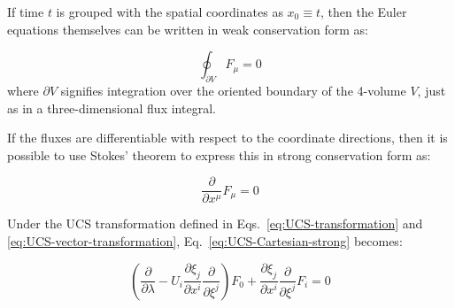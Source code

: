 
If time $t$ is grouped with the spatial coordinates as $x_0 \equiv t$, then the Euler equations themselves can be written in weak conservation form as:

\begin{equation}
\label{eq:UCS-Cartesian-weak}
\oint_{\partial V} {{F_\mu } = 0} 
\end{equation}
where $\partial V$ signifies integration over the oriented boundary of the 4-volume $V$, just as in a three-dimensional flux integral.

If the fluxes are differentiable with respect to the coordinate directions, then it is possible to use Stokes' theorem to express this in strong conservation form as:

\begin{equation}
\label{eq:UCS-Cartesian-strong}
\frac{\partial }{{\partial {x^\mu }}}{F_\mu } = 0
\end{equation}

Under the UCS transformation defined in Eqs.~\ref{eq:UCS-transformation} and \ref{eq:UCS-vector-transformation}, Eq.~\ref{eq:UCS-Cartesian-strong} becomes:

\[\left( {\frac{\partial }{{\partial \lambda }} - {U_i}\frac{{\partial {\xi _j}}}{{\partial {x^i}}}\frac{\partial }{{\partial {\xi ^j}}}} \right){F_0} + \frac{{\partial {\xi _j}}}{{\partial {x^i}}}\frac{\partial }{{\partial {\xi ^j}}}{F_i} = 0\]

